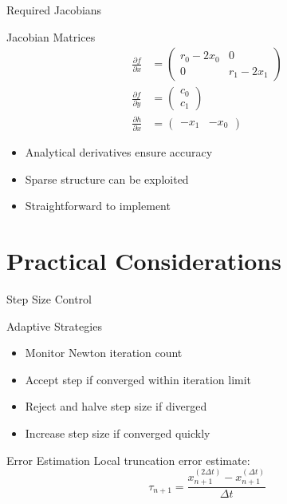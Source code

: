 \documentclass[10pt]{beamer}
\begin{document}
\begin{frame}{Required Jacobians}
\begin{block}{Jacobian Matrices}
\begin{align}
\frac{\partial f}{\partial x} &= \begin{pmatrix}
r_0 - 2x_0 & 0 \\
0 & r_1 - 2x_1
\end{pmatrix} \\[0.5em]
\frac{\partial f}{\partial y} &= \begin{pmatrix}
c_0 \\
c_1
\end{pmatrix} \\[0.5em]
\frac{\partial h}{\partial x} &= \begin{pmatrix}
-x_1 & -x_0
\end{pmatrix}
\end{align}
\end{block}

\begin{itemize}
\item Analytical derivatives ensure accuracy
\item Sparse structure can be exploited
\item Straightforward to implement
\end{itemize}
\end{frame}

\section{Practical Considerations}

\begin{frame}{Step Size Control}
\begin{block}{Adaptive Strategies}
\begin{itemize}
\item Monitor Newton iteration count
\item Accept step if converged within iteration limit
\item Reject and halve step size if diverged
\item Increase step size if converged quickly
\end{itemize}
\end{block}

\begin{block}{Error Estimation}
Local truncation error estimate:
\begin{equation}
\tau_{n+1} = \frac{x_{n+1}^{(2\Delta t)} - x_{n+1}^{(\Delta t)}}{\Delta t}
\end{equation}
\end{block}
\end{frame}
\end{document}
